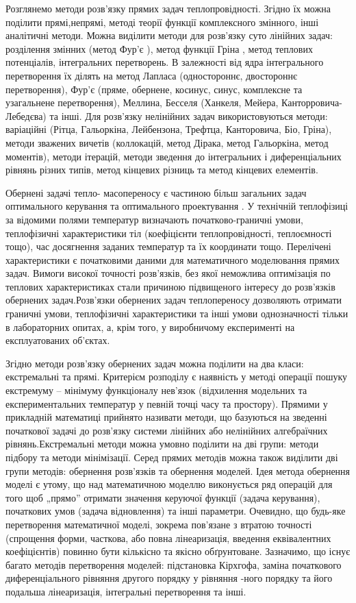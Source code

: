 Розглянемо методи розв’язку прямих задач теплопровідності. Згідно \cite{Kozdoba-Reshenie} їх можна поділити прямі,непрямі, методі
теорії функції комплексного змінного, інші аналітичні методи. Можна виділити методи для розв’язку суто лінійних задач:
розділення змінних (метод Фур’є ), метод функції Гріна \cite{Stoyan-DoPobudovy}, метод теплових потенціалів, інтегральних перетворень.
В залежності від ядра інтегрального перетворення їх ділять на метод Лапласа (одностороннє, двостороннє перетворення),
Фур’є (пряме, обернене, косинус, синус, комплексне та узагальнене перетворення), Меллина, Бесселя (Ханкеля, Мейера,
Канторровича-Лебедєва) та інші. Для розв’язку нелінійних задач використовуються методи: варіаційні (Рітца, Гальоркіна,
Лейбензона, Трефтца, Канторовича, Біо, Гріна), методи зважених вичетів (коллокацій, метод Дірака, метод Гальоркіна,
метод моментів), методи ітерацій, методи зведення до інтегральних і диференціальних рівнянь різних типів,
метод кінцевих різниць та метод кінцевих елементів.

Обернені задачі тепло- масопереносу є частиною більш загальних задач оптимального керування та оптимального
проектування \cite{Kozdoba-Metody}. У технічній теплофізиці за відомими полями температур визначають початково-граничні умови,
теплофізичні характеристики тіл (коефіцієнти теплопровідності, теплоємності тощо), час досягнення заданих температур
та їх координати тощо. Перелічені характеристики є початковими даними для математичного моделювання прямих задач.
Вимоги високої точності розв’язків, без якої неможлива оптимізація по теплових характеристиках стали причиною
підвищеного інтересу до розв’язків обернених задач.Розв’язки обернених задач теплопереносу  дозволяють отримати
граничні умови, теплофізичні характеристики та інші умови однозначності тільки в лабораторних опитах, а, крім того,
у виробничому експерименті на експлуатованих об’єктах.

Згідно\cite{KozdobaKruckovskiy-MetodyResheniya} методи розв’язку обернених задач можна поділити на два класи: екстремальні та прямі. Критерієм розподілу
є наявність у методі операції пошуку екстремуму – мінімуму функціоналу нев’язок (відхилення модельних та
експериментальних температур у певній точці часу та простору). Прямими  у прикладній математиці прийнято називати
методи, що базуються на зведенні початкової задачі до розв’язку системи лінійних або нелінійних алгебраїчних
рівнянь.Екстремальні методи можна умовно поділити на дві групи: методи підбору та методи мінімізації. Серед прямих
методів можна також виділити дві групи методів: обернення розв’язків та обернення моделей. Ідея метода обернення
моделі є утому, що над математичною моделлю виконується ряд операцій для того щоб „прямо” отримати значення керуючої
функції (задача керування), початкових умов (задача відновлення) та інші параметри. Очевидно, що будь-яке
перетворення  математичної моделі, зокрема пов’язане з втратою точності (спрощення форми, часткова, або повна
лінеаризація, введення еквівалентних коефіцієнтів) повинно бути кількісно та якісно обґрунтоване. Зазначимо, що
існує багато методів перетворення моделей: підстановка Кірхгофа, заміна початкового диференціального рівняння
другого порядку у рівняння -ного порядку та його подальша лінеаризація, інтегральні перетворення та інші.

